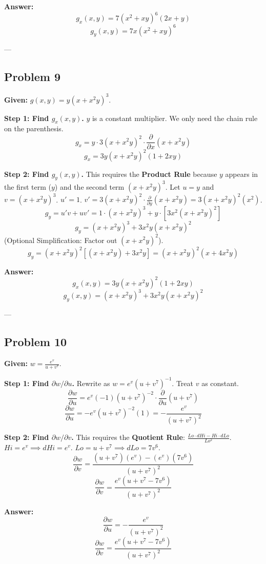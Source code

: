 \documentclass{article}
\begin{document}
\textbf{Answer:}
\[ g_x(x, y) = 7(x^2 + xy)^6 (2x + y) \]
\[ g_y(x, y) = 7x(x^2 + xy)^6 \]

---

\subsection*{Problem 9}
\textbf{Given:} $g(x, y) = y(x + x^2y)^3$.

\textbf{Step 1: Find $g_x(x, y)$.}
$y$ is a constant multiplier. We only need the chain rule on the parenthesis.
\[ g_x = y \cdot 3(x + x^2y)^2 \cdot \frac{\partial}{\partial x}(x + x^2y) \]
\[ g_x = 3y(x + x^2y)^2 (1 + 2xy) \]

\textbf{Step 2: Find $g_y(x, y)$.}
This requires the \textbf{Product Rule} because $y$ appears in the first term ($y$) and the second term $(x+x^2y)^3$.
Let $u = y$ and $v = (x + x^2y)^3$.
$u' = 1$.
$v' = 3(x + x^2y)^2 \cdot \frac{\partial}{\partial y}(x + x^2y) = 3(x + x^2y)^2 (x^2)$.
\[ g_y = u'v + uv' = 1 \cdot (x + x^2y)^3 + y \cdot [3x^2(x + x^2y)^2] \]
\[ g_y = (x + x^2y)^3 + 3x^2y(x + x^2y)^2 \]
(Optional Simplification: Factor out $(x+x^2y)^2$).
\[ g_y = (x + x^2y)^2 [ (x + x^2y) + 3x^2y ] = (x+x^2y)^2(x + 4x^2y) \]

\textbf{Answer:}
\[ g_x(x, y) = 3y(x + x^2y)^2 (1 + 2xy) \]
\[ g_y(x, y) = (x + x^2y)^3 + 3x^2y(x + x^2y)^2 \]

---

\subsection*{Problem 10}
\textbf{Given:} $w = \frac{e^v}{u + v^7}$.

\textbf{Step 1: Find $\partial w / \partial u$.}
Rewrite as $w = e^v (u + v^7)^{-1}$. Treat $v$ as constant.
\[ \frac{\partial w}{\partial u} = e^v (-1)(u + v^7)^{-2} \cdot \frac{\partial}{\partial u}(u + v^7) \]
\[ \frac{\partial w}{\partial u} = -e^v (u + v^7)^{-2} (1) = -\frac{e^v}{(u + v^7)^2} \]

\textbf{Step 2: Find $\partial w / \partial v$.}
This requires the \textbf{Quotient Rule}: $\frac{Lo \cdot dHi - Hi \cdot dLo}{Lo^2}$.
$Hi = e^v \implies dHi = e^v$.
$Lo = u + v^7 \implies dLo = 7v^6$.
\[ \frac{\partial w}{\partial v} = \frac{(u + v^7)(e^v) - (e^v)(7v^6)}{(u + v^7)^2} \]
\[ \frac{\partial w}{\partial v} = \frac{e^v(u + v^7 - 7v^6)}{(u + v^7)^2} \]

\textbf{Answer:}
\[ \frac{\partial w}{\partial u} = -\frac{e^v}{(u + v^7)^2} \]
\[ \frac{\partial w}{\partial v} = \frac{e^v(u + v^7 - 7v^6)}{(u + v^7)^2} \]
\end{document}
